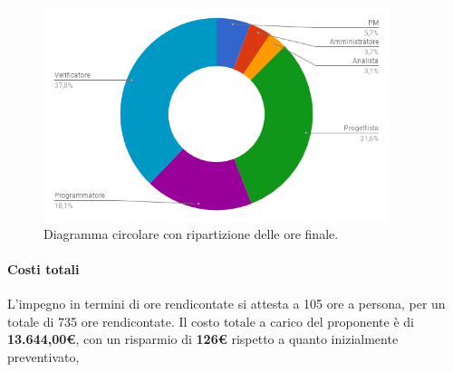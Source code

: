 \begin{figure}[H] 
	\centering 
	\includegraphics[width=0.9\textwidth]{images/CircolareFinaleRendicontate.png} 
	\caption{Diagramma circolare con ripartizione delle ore finale.}
	\label{CircolareFinaleRendicontate}
\end{figure}

\paragraph{Costi totali} \Spazio
L’impegno in termini di ore rendicontate si attesta a 105 ore a persona, per un totale di 735 ore rendicontate.
Il costo totale a carico del proponente è di \textbf{13.644,00\euro}, con un risparmio di \textbf{126\euro} rispetto a quanto inizialmente preventivato,
